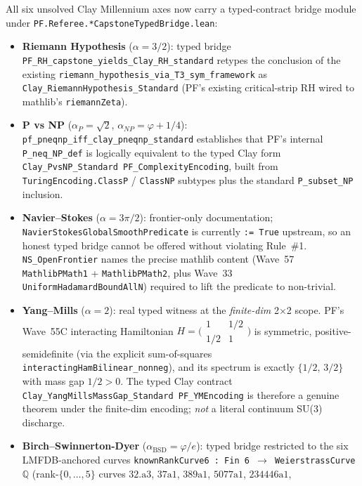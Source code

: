 All six unsolved Clay Millennium axes now carry a typed-contract
bridge module under \texttt{PF.Referee.*CapstoneTypedBridge.lean}:
\begin{itemize}
\item \textbf{Riemann Hypothesis} ($\alpha = 3/2$): typed bridge
\texttt{PF\_RH\_capstone\_yields\_Clay\_RH\_standard} retypes the
conclusion of the existing \texttt{riemann\_hypothesis\_via\_T3\_sym\_framework}
as \texttt{Clay\_RiemannHypothesis\_Standard} (PF's existing
critical-strip RH wired to mathlib's \texttt{riemannZeta}).
\item \textbf{P vs NP} ($\alpha_P = \sqrt{2}$, $\alpha_{NP} = \varphi + 1/4$):
\texttt{pf\_pneqnp\_iff\_clay\_pneqnp\_standard} establishes that PF's
internal \texttt{P\_neq\_NP\_def} is logically equivalent to the typed
Clay form \texttt{Clay\_PvsNP\_Standard PF\_ComplexityEncoding}, built
from \texttt{TuringEncoding.ClassP} / \texttt{ClassNP} subtypes plus
the standard \texttt{P\_subset\_NP} inclusion.
\item \textbf{Navier--Stokes} ($\alpha = 3\pi/2$): frontier-only
documentation; \texttt{NavierStokesGlobalSmoothPredicate} is currently
\texttt{:= True} upstream, so an honest typed bridge cannot be offered
without violating Rule~\#1. \texttt{NS\_OpenFrontier} names the precise
mathlib content (Wave~57 \texttt{MathlibPMath1} +
\texttt{MathlibPMath2}, plus Wave~33 \texttt{UniformHadamardBoundAllN})
required to lift the predicate to non-trivial.
\item \textbf{Yang--Mills} ($\alpha = 2$): real typed witness at the
\emph{finite-dim} 2$\times$2 scope. PF's Wave~55C interacting
Hamiltonian $H = \big(\begin{smallmatrix} 1 & 1/2 \\ 1/2 & 1
\end{smallmatrix}\big)$ is symmetric, positive-semidefinite (via the
explicit sum-of-squares \texttt{interactingHamBilinear\_nonneg}), and
its spectrum is exactly $\{1/2,\, 3/2\}$ with mass gap $1/2 > 0$. The
typed Clay contract \texttt{Clay\_YangMillsMassGap\_Standard
PF\_YMEncoding} is therefore a genuine theorem under the finite-dim
encoding; \emph{not} a literal continuum SU(3) discharge.
\item \textbf{Birch--Swinnerton-Dyer} ($\alpha_{\mathrm{BSD}} = \varphi/e$):
typed bridge restricted to the six LMFDB-anchored curves
\texttt{knownRankCurve6 : Fin 6 $\to$ WeierstrassCurve $\mathbb{Q}$}
(rank-$\{0,\ldots,5\}$ curves $32.\mathrm{a}3$, $37\mathrm{a}1$,
$389\mathrm{a}1$, $5077\mathrm{a}1$, $234446\mathrm{a}1$,

\end{itemize}
